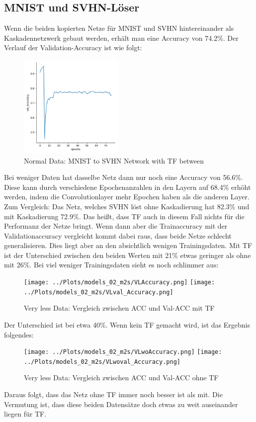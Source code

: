 \subsection{MNIST und SVHN-Löser}
    Wenn die beiden kopierten Netze für MNIST und SVHN hintereinander 
    als Kaskadennetzwerk gebaut werden, erhält man eine Accuracy von 
    74.2\%. Der Verlauf der Validation-Accuracy ist wie folgt: 
    \begin{figure}[htpb]
        \includegraphics[height=5cm]{../Plots/models_02_m2s/val_Accuracy.png}
        \caption{\label{fig:figure6} Normal Data: MNIST to SVHN Network with TF between}
    \end{figure}
    Bei weniger Daten hat dasselbe Netz dann nur noch eine Accuracy von 56.6\%. Diese kann 
    durch verschiedene Epochenanzahlen in den Layern auf 68.4\% erhöht werden, 
    indem die Convolutionlayer mehr Epochen haben als die anderen Layer.
    Zum Vergleich: 
    Das Netz, welches SVHN löst ohne Kaskadierung hat 82.3\% und mit Kaskadierung 
    72.9\%. Das heißt, dass TF auch in diesem Fall nichts für die Performanz 
    der Netze bringt. 
    Wenn dann aber die Trainaccuracy mit der Validationaccuracy vergleicht kommt 
    dabei raus, dass beide Netze schlecht generalisieren. Dies liegt aber an den 
    absichtlich wenigen Trainingsdaten. Mit TF ist der Unterschied zwischen den 
    beiden Werten mit 21\% etwas geringer als ohne mit 26\%.
    Bei viel weniger Trainingsdaten sieht es noch schlimmer aus: 
    \begin{figure}[htpb]
        \texttt{[image: ../Plots/models\_02\_m2s/VLAccuracy.png]}
        \texttt{[image: ../Plots/models\_02\_m2s/VLval\_Accuracy.png]}
        \caption{\label{fig:figure7} Very less Data: Vergleich zwischen ACC und Val-ACC mit TF}
    \end{figure}
    Der Unterschied ist bei etwa 40\%. Wenn kein TF gemacht wird, ist das Ergebnis folgendes: 
    \begin{figure}
        \texttt{[image: ../Plots/models\_02\_m2s/VLwoAccuracy.png]}
        \texttt{[image: ../Plots/models\_02\_m2s/VLwoval\_Accuracy.png]}
        \caption{\label{fig:figure8} Very less Data: Vergleich zwischen ACC und Val-ACC ohne TF}
    \end{figure}
    Daraus folgt, dass das Netz ohne TF immer noch besser ist als mit. 
    Die Vermutung ist, dass diese beiden Datensätze doch etwas zu weit 
    auseinander liegen für TF.

